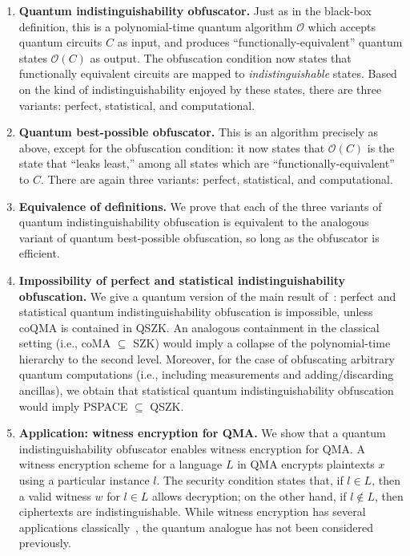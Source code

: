 \documentclass[envcountsame]{llncs}
\numberwithin{equation}{section}
\newcommand{\algo}{\mathcal}
\begin{document}
\begin{enumerate}
\item \textbf{Quantum indistinguishability obfuscator.} Just as in the black-box definition, this is a polynomial-time quantum algorithm $\algo O$ which accepts quantum circuits $C$ as input, and produces ``functionally-equivalent'' quantum states $\algo O(C)$ as output. The obfuscation condition now states that functionally equivalent circuits are mapped to \emph{indistinguishable} states. Based on the kind of indistinguishability enjoyed by these states, there are three variants: perfect, statistical, and computational.
\item \textbf{Quantum best-possible obfuscator.} This is an algorithm precisely as above, except for the obfuscation condition: it now states that $\algo O(C)$ is the state that ``leaks least,'' among all states which are ``functionally-equivalent'' to $C$. There are again three variants: perfect, statistical, and computational.
\item \textbf{Equivalence of definitions.} We prove that each of the three variants of quantum indistinguishability obfuscation is equivalent to the analogous variant of quantum best-possible obfuscation, so long as the obfuscator is efficient.
\item \textbf{Impossibility of perfect and statistical indistinguishability obfuscation.} We give a quantum version of the main result of~\cite{GR07}: perfect and statistical quantum indistinguishability obfuscation is impossible, unless coQMA is contained in QSZK. An analogous containment in the classical setting (i.e., coMA $\subseteq$ SZK) would imply a collapse of the polynomial-time hierarchy to the second level. Moreover, for the case of obfuscating arbitrary quantum computations (i.e., including measurements and adding/discarding ancillas), we obtain that statistical quantum indistinguishability obfuscation would imply PSPACE $\subseteq$ QSZK. %
\item \textbf{Application: witness encryption for QMA.} We show that a quantum indistinguishability obfuscator enables witness encryption for QMA. A witness encryption scheme for a language $L$ in QMA encrypts plaintexts $x$ using a particular instance $l$. The security condition states that, if $l \in L$, then a valid witness $w$ for $l \in L$ allows decryption; on the other hand, if $l \notin L$, then ciphertexts are indistinguishable. While witness encryption has several applications classically~\cite{GGSW13}, the quantum analogue has not been considered previously.
\end{enumerate}
\end{document}
